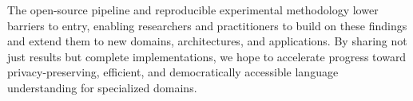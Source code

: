 The open-source pipeline and reproducible experimental methodology lower barriers to entry, enabling researchers and practitioners to build on these findings and extend them to new domains, architectures, and applications. By sharing not just results but complete implementations, we hope to accelerate progress toward privacy-preserving, efficient, and democratically accessible language understanding for specialized domains.